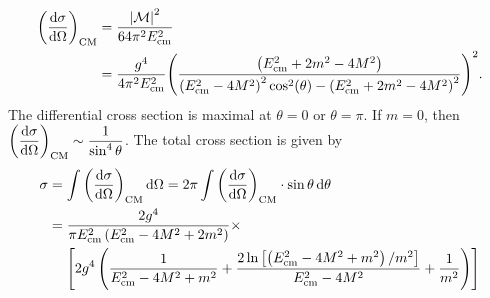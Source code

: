 \documentclass{article}
\begin{document}
\begin{align*}
    \qty(\dv{\sigma}{\Omega})_{\mathrm{CM}} &= \frac{\abs{\mathcal{M}}^2}{64\pi^2 E^2_{\mathrm{cm}}} \\
    &= \frac{g^4}{4 \pi^2 E_{\mathrm{cm}}^2} \qty(\frac{ \qty(E_{\mathrm{cm}}^2+2 m^2-4 M^2)}{\qty(E_{\mathrm{cm}}^2-4 M^2)^2 \cos ^2(\theta )-\qty(E_{\mathrm{cm}}^2+2 m^2-4 M^2)^2})^2.
\end{align*}
The differential cross section is maximal at $\theta = 0$ or $\theta = \pi$.
If $m = 0$, then $\displaystyle \qty(\dv{\sigma}{\Omega})_{\mathrm{CM}} \sim \frac{1}{\sin^4 \theta}$.
The total cross section is given by
\begin{align*}
    \sigma &= \int \qty(\dv{\sigma}{\Omega})_{\mathrm{CM}} \dd{\Omega} = 2\pi \int \qty(\dv{\sigma}{\Omega})_{\mathrm{CM}} \cdot \sin\theta \dd{\theta} \\
    &= \frac{2g^4}{\pi  E_{\mathrm{cm}}^2 \left(E_{\mathrm{cm}}^2-4 M^2+2 m^2\right)} \times \\
    &\phantom{{}={}} \qty[
        2 g^4 \left(\frac{1}{E_{\mathrm{cm}}^2-4 M^2+m^2}+\frac{2 \ln \qty[\left(E_{\mathrm{cm}}^2-4 M^2+m^2\right)/m^2]}{E_{\mathrm{cm}}^2-4 M^2}+\frac{1}{m^2}\right)
    ]
\end{align*}
\end{document}

